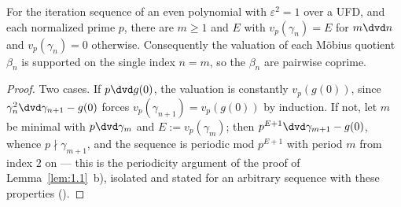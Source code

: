 \begin{theorem}
  \label{thm:valshape}
  \leanok
  For the iteration sequence of an even polynomial with $\varepsilon^2 = 1$ over a UFD, and each
  normalized prime $p$, there are $m \ge 1$ and $E$ with $v_p(\gamma_n) = E$ for $m \dvd n$ and
  $v_p(\gamma_n) = 0$ otherwise. Consequently the valuation of each Möbius quotient $\beta_n$ is
  supported on the single index $n = m$, so the $\beta_n$ are pairwise coprime.
\end{theorem}
\begin{proof}
  \leanok
  Two cases. If $p \dvd g(0)$, the valuation is constantly $v_p(g(0))$, since
  $\gamma_n^2 \dvd \gamma_{n+1} - g(0)$ forces $v_p(\gamma_{n+1}) = v_p(g(0))$ by induction. If
  not, let $m$ be minimal with $p \dvd \gamma_m$ and $E := v_p(\gamma_m)$; then
  $p^{E+1} \dvd \gamma_{m+1} - g(0)$, whence $p \nmid \gamma_{m+1}$, and the sequence is periodic
  mod $p^{E+1}$ with period $m$ from index $2$ on --- this is the periodicity argument of the
  proof of Lemma~\ref{lem:1.1}~b), isolated and stated for an arbitrary sequence with these
  properties ().
\end{proof}

